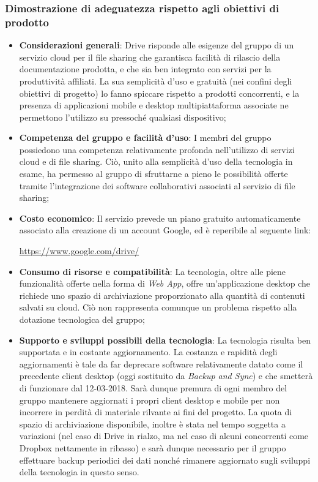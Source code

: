 \documentclass[./../Technology Baseline.tex]{subfiles}
\begin{document}
\subsubsection{Dimostrazione di adeguatezza rispetto agli obiettivi di prodotto}
\begin{itemize}
	\item \textbf{Considerazioni generali}: Drive risponde alle esigenze del gruppo di un servizio cloud per il file sharing che garantisca facilità di rilascio della documentazione prodotta, e che sia ben integrato con servizi per la produttività affiliati. La sua semplicità d'uso e gratuità (nei confini degli obiettivi di progetto) lo fanno spiccare rispetto a prodotti concorrenti, e la presenza di applicazioni mobile e desktop multipiattaforma associate ne permettono l'utilizzo su pressoché qualsiasi dispositivo;
	\item \textbf{Competenza del gruppo e facilità d'uso}: I membri del gruppo possiedono una competenza relativamente profonda nell'utilizzo di servizi cloud e di file sharing. Ciò, unito alla semplicità d'uso della tecnologia in esame, ha permesso al gruppo di sfruttarne a pieno le possibilità offerte tramite l'integrazione dei software collaborativi associati al servizio di file sharing;
	\item \textbf{Costo economico}: Il servizio prevede un piano gratuito automaticamente associato alla creazione di un account Google, ed è reperibile al seguente link:
	\begin{center}
		\url{https://www.google.com/drive/}
	\end{center}
	\item \textbf{Consumo di risorse e compatibilità}: La tecnologia, oltre alle piene funzionalità offerte nella forma di \textit{Web App}, offre un'applicazione desktop che richiede uno spazio di archiviazione proporzionato alla quantità di contenuti salvati su cloud. Ciò non rappresenta comunque un problema rispetto alla dotazione tecnologica del gruppo;
	\item \textbf{Supporto e sviluppi possibili della tecnologia}: La tecnologia risulta ben supportata e in costante aggiornamento. La costanza e rapidità degli aggiornamenti è tale da far deprecare software relativamente datato come il precedente client desktop (oggi sostituito da \textit{Backup and Sync}) e che smetterà di funzionare dal 12-03-2018. Sarà dunque premura di ogni membro del gruppo mantenere aggiornati i propri client desktop e mobile per non incorrere in perdità di materiale rilvante ai fini del progetto. La quota di spazio di archiviazione disponibile, inoltre è stata nel tempo soggetta a variazioni (nel caso di Drive in rialzo, ma nel caso di alcuni concorrenti come Dropbox nettamente in ribasso) e sarà dunque necessario per il gruppo effettuare backup periodici dei dati nonché rimanere aggiornato sugli sviluppi della tecnologia in questo senso.
\end{itemize}
\end{document}
